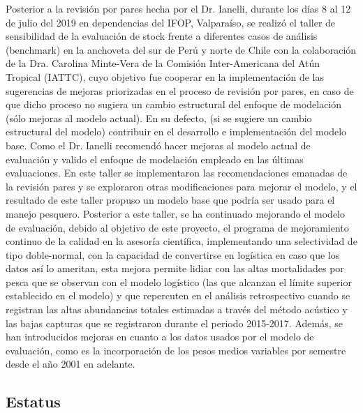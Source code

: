 \documentclass[letter,11pt]{article}
\begin{document}
Posterior a la revisi\'on por pares hecha por el Dr. Ianelli, durante los
d\'ias 8 al 12 de julio del 2019 en dependencias del IFOP, Valpara\'iso, se
realiz\'o el taller de sensibilidad de la evaluaci\'on de stock frente a
diferentes casos de an\'alisis (benchmark) en la anchoveta del sur de
Per\'u y norte de Chile con la colaboraci\'on de la Dra. Carolina Minte-Vera
de la Comisi\'on Inter-Americana del At\'un Tropical (IATTC), cuyo objetivo
fue cooperar en la implementaci\'on de las sugerencias de mejoras
priorizadas en el proceso de revisi\'on por pares, en caso de que dicho
proceso no sugiera un cambio estructural del enfoque de modelaci\'on (s\'olo
mejoras al modelo actual). En su defecto, (si se sugiere un cambio
estructural del modelo) contribuir en el desarrollo e implementaci\'on del
modelo base. Como el Dr. Ianelli recomend\'o hacer mejoras al modelo
actual de evaluaci\'on y valido el enfoque de modelaci\'on empleado en las
\'ultimas evaluaciones. En este taller se implementaron las
recomendaciones emanadas de la revisi\'on pares y se exploraron otras
modificaciones para mejorar el modelo, y el resultado de este taller
propuso un modelo base que podr\'ia ser usado para el manejo pesquero.
Posterior a este taller, se ha continuado mejorando el modelo de
evaluaci\'on, debido al objetivo de este proyecto, el programa de
mejoramiento continuo de la calidad en la asesor\'ia cient\'ifica,
implementando una selectividad de tipo doble-normal, con la capacidad de
convertirse en log\'istica en caso que los datos as\'i lo ameritan, esta
mejora permite lidiar con las altas mortalidades por pesca que se
observan con el modelo log\'istico (las que alcanzan el l\'imite superior
establecido en el modelo) y que repercuten en el an\'alisis retrospectivo
cuando se registran las altas abundancias totales estimadas a trav\'es del
m\'etodo ac\'ustico y las bajas capturas que se registraron durante el
periodo 2015-2017. Adem\'as, se han introducidos mejoras en cuanto a los
datos usados por el modelo de evaluaci\'on, como es la incorporaci\'on de
los pesos medios variables por semestre desde el a\~{n}o 2001 en adelante.


\subsection{Estatus}
\end{document}
